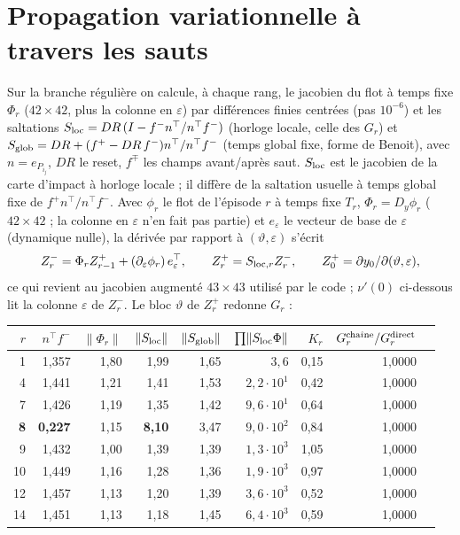 \documentclass[11pt,a4paper]{article}
\theoremstyle{remark}
\newcommand{\vth}{\vartheta}
\begin{document}
\section{Propagation variationnelle \`a travers les sauts}\label{sec:prop}
Sur la branche r\'eguli\`ere on calcule, \`a chaque rang, le jacobien du flot \`a temps fixe $\Phi_r$ ($42\times42$, plus la colonne en $\varepsilon$) par diff\'erences finies centr\'ees (pas $10^{-6}$) et les saltations $S_{\rm loc}=DR\,(I-f^-n^\top/n^\top f^-)$ (horloge locale, celle des $G_r$) et $S_{\rm glob}=DR+(f^+-DR\,f^-)n^\top/n^\top f^-$ (temps global fixe, forme de Benoit), avec $n=e_{P_{i_j}}$, $DR$ le reset, $f^\mp$ les champs avant/apr\`es saut. $S_{\rm loc}$ est le jacobien de la carte d'impact \`a horloge locale ; il diff\`ere de la saltation usuelle \`a temps global fixe de $f^+n^\top/n^\top f^-$. Avec $\phi_r$ le flot de l'\'episode $r$ \`a temps fixe $T_r$, $\Phi_r=D_y\phi_r$ ($42\times42$ ; la colonne en $\varepsilon$ n'en fait pas partie) et $e_\varepsilon$ le vecteur de base de $\varepsilon$ (dynamique nulle), la d\'eriv\'ee par rapport \`a $(\vth,\varepsilon)$ s'\'ecrit
\[ Z_r^-=\Phi_rZ_{r-1}^++(\partial_\varepsilon\phi_r)\,e_\varepsilon^\top,\qquad Z_r^+=S_{{\rm loc},r}Z_r^-,\qquad Z_0^+=\partial y_0/\partial(\vth,\varepsilon), \]
ce qui revient au jacobien augment\'e $43\times43$ utilis\'e par le code ; $\nu'(0)$ ci-dessous lit la colonne $\varepsilon$ de $Z_r^-$. Le bloc $\vth$ de $Z_r^+$ redonne $G_r$ :
\begin{center}\small
\begin{tabular}{r|rrrrrrr|r}
\toprule
$r$ & $n^\top f^-$ & $\lVert\Phi_r\rVert$ & $\lVert S_{\rm loc}\rVert$ & $\lVert S_{\rm glob}\rVert$ & $\prod\lVert S_{\rm loc}\Phi\rVert$ & $K_r$ & $G^{\rm cha\hat\imath ne}_r/G^{\rm direct}_r$\\
\midrule
1 & 1,357 & 1,80 & 1,99 & 1,65 & $3{,}6$ & 0,15 & 1,0000\\
4 & 1,441 & 1,21 & 1,41 & 1,53 & $2{,}2\cdot10^1$ & 0,42 & 1,0000\\
7 & 1,426 & 1,19 & 1,35 & 1,42 & $9{,}6\cdot10^1$ & 0,64 & 1,0000\\
\textbf{8} & \textbf{0,227} & 1,15 & \textbf{8,10} & 3,47 & $9{,}0\cdot10^2$ & 0,84 & 1,0000\\
9 & 1,432 & 1,00 & 1,39 & 1,39 & $1{,}3\cdot10^3$ & 1,05 & 1,0000\\
10 & 1,449 & 1,16 & 1,28 & 1,36 & $1{,}9\cdot10^3$ & 0,97 & 1,0000\\
12 & 1,457 & 1,13 & 1,20 & 1,39 & $3{,}6\cdot10^3$ & 0,52 & 1,0000\\
14 & 1,451 & 1,13 & 1,18 & 1,45 & $6{,}4\cdot10^3$ & 0,59 & 1,0000\\
\bottomrule
\end{tabular}
\end{center}
\end{document}
